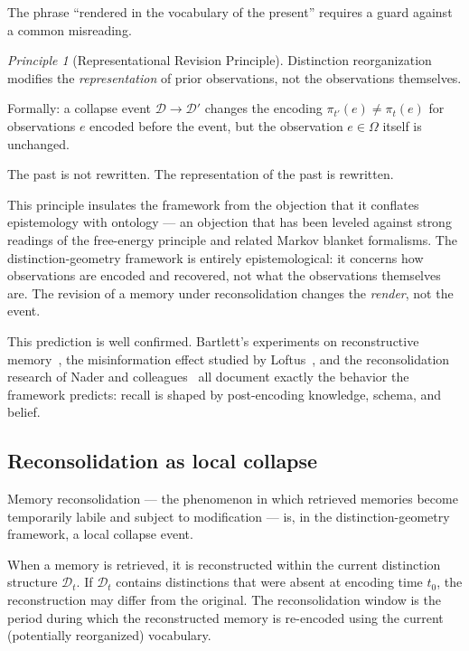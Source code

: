 \documentclass[11pt, a4paper]{article}
\theoremstyle{plain}
\theoremstyle{definition}
\theoremstyle{remark}
\newtheorem{principle}[theorem]{Principle}
\newcommand{\Dist}{\mathcal{D}}
\newcommand{\Proj}{\pi}
\begin{document}
The phrase ``rendered in the vocabulary of the present'' requires a
guard against a common misreading.

\begin{principle}[Representational Revision Principle]
\label{prin:reprrev}
Distinction reorganization modifies the \emph{representation}
of prior observations, not the observations themselves.

Formally: a collapse event $\Dist \to \Dist'$ changes the encoding
$\Proj_{t'}(e) \neq \Proj_t(e)$ for observations $e$ encoded
before the event, but the observation $e \in \Omega$ itself is
unchanged.

The past is not rewritten. The representation of the past is rewritten.
\end{principle}

This principle insulates the framework from the objection that it
conflates epistemology with ontology --- an objection that has been
leveled against strong readings of the free-energy principle
and related Markov blanket formalisms. The distinction-geometry
framework is entirely epistemological: it concerns how observations
are encoded and recovered, not what the observations themselves are.
The revision of a memory under reconsolidation changes the \emph{render},
not the event.

This prediction is well confirmed. Bartlett's experiments
on reconstructive memory~\cite{bartlett1932}, the misinformation
effect studied by Loftus~\cite{loftus1979}, and the
reconsolidation research of Nader and colleagues~\cite{nader2000}
all document exactly the behavior the framework predicts:
recall is shaped by post-encoding knowledge, schema, and belief.

\subsection{Reconsolidation as local collapse}

Memory reconsolidation --- the phenomenon in which retrieved
memories become temporarily labile and subject to modification ---
is, in the distinction-geometry framework, a local collapse event.

When a memory is retrieved, it is reconstructed within the current
distinction structure $\Dist_t$. If $\Dist_t$ contains distinctions
that were absent at encoding time $t_0$, the reconstruction may
differ from the original. The reconsolidation window is the period
during which the reconstructed memory is re-encoded using the
current (potentially reorganized) vocabulary.
\end{document}
